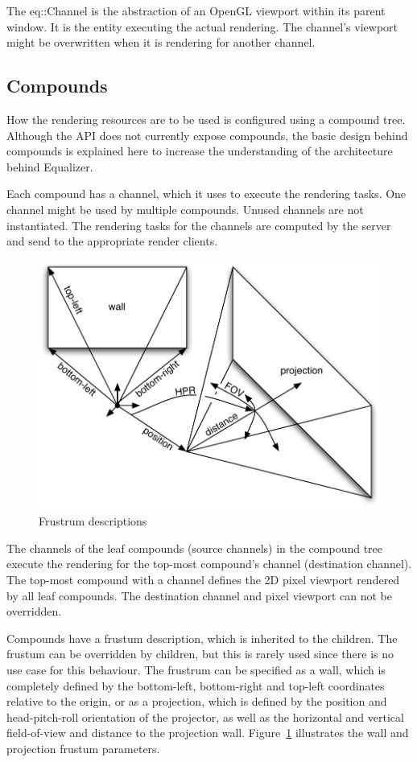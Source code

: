\documentclass[10pt,a4]{scrartcl}
\newcommand{\fig}[1]{Figure~\ref{#1}}
\begin{document}
The \textsf{eq::Channel} is the abstraction of an OpenGL viewport within
its parent window. It is the entity executing the actual rendering. The
channel's viewport might be overwritten when it is rendering for another
channel.


\subsection{Compounds}

How the rendering resources are to be used is configured using a
compound tree. Although the API does not currently expose compounds, the
basic design behind compounds is explained here to increase the
understanding of the architecture behind Equalizer.

Each compound has a channel, which it uses to execute the rendering
tasks. One channel might be used by multiple compounds. Unused channels
are not instantiated. The rendering tasks for the channels are computed
by the server and send to the appropriate render clients.

\begin{figure}
  \includegraphics[width=.6\textwidth]{images/frustra.pdf}
  {\caption{\small\label{fFrustra}Frustrum descriptions}}
\end{figure}
The channels of the leaf compounds (source channels) in the compound
tree execute the rendering for the top-most compound's channel
(destination channel). The top-most compound with a channel defines the
2D pixel viewport rendered by all leaf compounds. The destination
channel and pixel viewport can not be overridden.

Compounds have a frustum description, which is inherited to the
children. The frustum can be overridden by children, but this is rarely
used since there is no use case for this behaviour. The frustrum can be
specified as a wall, which is completely defined by the bottom-left,
bottom-right and top-left coordinates relative to the origin, or as a
projection, which is defined by the position and head-pitch-roll
orientation of the projector, as well as the horizontal and vertical
field-of-view and distance to the projection wall. \fig{fFrustra}
illustrates the wall and projection frustum parameters.
\end{document}
